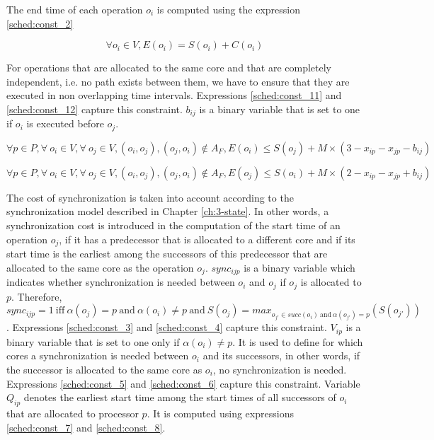 The end time of each operation $o_i$ is computed using the expression \ref{sched:const_2}

\begin{equation}
\forall o_i \in V, E(o_i) = S(o_i) + C(o_i)
\label{sched:const_2}
\end{equation}

For operations that are allocated to the same core and that are completely independent, i.e. no path exists between them, we have to ensure that they are executed in non overlapping time intervals. Expressions \ref{sched:const_11} and \ref{sched:const_12} capture this constraint. $b_{ij}$ is a binary variable that is set to one if $o_i$ is executed before $o_j$.

\begin{equation}
\forall p \in P, \forall\ o_i \in V, \forall\ o_j \in V, (o_i,o_j), (o_j,o_i) \notin A_F, E(o_i) \leq S(o_j) + M \times (3 - x_{ip} - x_{jp} - b_{ij}) 
\label{sched:const_11}
\end{equation}

\begin{equation}
\forall p \in P, \forall\ o_i \in V, \forall\ o_j \in V, (o_i,o_j), (o_j,o_i) \notin A_F, E(o_j) \leq S(o_i) + M \times (2 - x_{ip} - x_{jp} + b_{ij}) 
\label{sched:const_12}
\end{equation}

The cost of synchronization is taken into account according to the synchronization model described in Chapter \ref{ch:3-state}. In other words, a synchronization cost is introduced in the computation of the start time of an operation $o_j$, if it has a predecessor that is allocated to a different core and if its start time is the earliest among the successors of this predecessor that are allocated to the same core as the operation $o_j$. $sync_{ijp}$ is a binary variable which indicates whether synchronization is needed between $o_i$ and $o_j$ if $o_j$ is allocated to $p$. Therefore, $sync_{ijp} = 1\ \text{iff}\ \alpha(o_j)=p\ \text{and}\ \alpha(o_i)\neq p\  \text{and}\ S(o_j) = max_{o_{j'} \in succ(o_i)\ \text{and}\ \alpha(o_{j'}) = p}(S(o_{j'}))$. Expressions \ref{sched:const_3} and \ref{sched:const_4} capture this constraint. $V_{ip}$ is a binary variable that is set to one only if $\alpha(o_i) \neq p$. It is used to define for which cores a synchronization is needed between $o_i$ and its successors, in other words, if the successor is allocated to the same core as $o_i$, no synchronization is needed. Expressions \ref{sched:const_5} and \ref{sched:const_6} capture this constraint. Variable $Q_{ip}$ denotes the earliest start time among the start times of all successors of $o_i$ that are allocated to processor $p$. It is computed using expressions \ref{sched:const_7} and \ref{sched:const_8}. 


